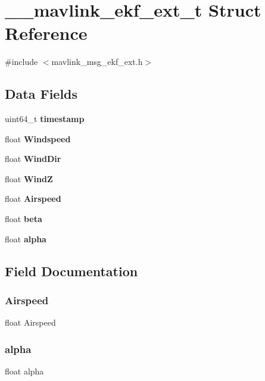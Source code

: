 \section{\+\_\+\+\_\+mavlink\+\_\+ekf\+\_\+ext\+\_\+t Struct Reference}
\label{struct____mavlink__ekf__ext__t}


{\ttfamily \#include $<$mavlink\+\_\+msg\+\_\+ekf\+\_\+ext.\+h$>$}

\subsection*{Data Fields}
\begin{DoxyCompactItemize}
\item 
uint64\+\_\+t \textbf{ timestamp}
\item 
float \textbf{ Windspeed}
\item 
float \textbf{ Wind\+Dir}
\item 
float \textbf{ WindZ}
\item 
float \textbf{ Airspeed}
\item 
float \textbf{ beta}
\item 
float \textbf{ alpha}
\end{DoxyCompactItemize}


\subsection{Field Documentation}
\mbox{\label{struct____mavlink__ekf__ext__t_a8cf22d5be0b9d1497f141bd068a76e86}} 
\subsubsection{Airspeed}
{\footnotesize\ttfamily float Airspeed}

\mbox{\label{struct____mavlink__ekf__ext__t_ab1551d8043c2aa4410fb7dbb1fe3be7b}} 
\subsubsection{alpha}
{\footnotesize\ttfamily float alpha}

